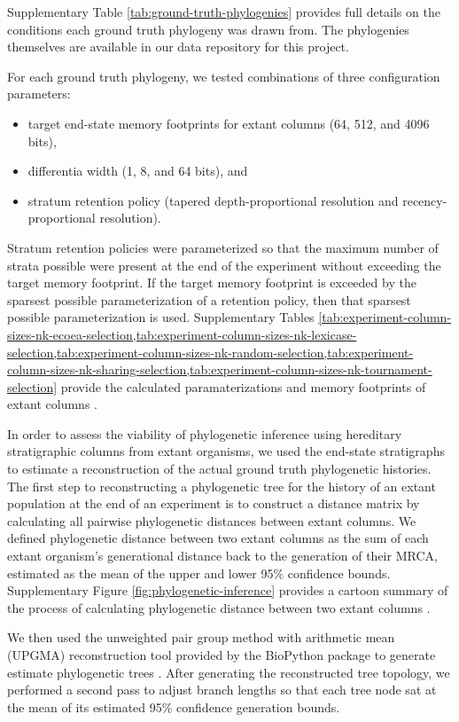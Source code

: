 Supplementary Table \ref{tab:ground-truth-phylogenies} provides full details on the conditions each ground truth phylogeny was drawn from.
The phylogenies themselves are available in our data repository for this project.

For each ground truth phylogeny, we tested combinations of three configuration parameters:
\begin{itemize}
  \item target end-state memory footprints for extant columns (64, 512, and 4096 bits),
  \item differentia width (1, 8, and 64 bits), and
  \item stratum retention policy (tapered depth-proportional resolution and recency-proportional resolution).
\end{itemize}

Stratum retention policies were parameterized so that the maximum number of strata possible were present at the end of the experiment without exceeding the target memory footprint.
If the target memory footprint is exceeded by the sparsest possible parameterization of a retention policy, then that sparsest possible parameterization is used.
Supplementary Tables \cref{tab:experiment-column-sizes-nk-ecoea-selection,tab:experiment-column-sizes-nk-lexicase-selection,tab:experiment-column-sizes-nk-random-selection,tab:experiment-column-sizes-nk-sharing-selection,tab:experiment-column-sizes-nk-tournament-selection} provide the calculated paramaterizations and memory footprints of extant columns \citep{moreno2022hstratconceptsupplement}.

In order to assess the viability of phylogenetic inference using hereditary stratigraphic columns from extant organisms, we used the end-state stratigraphs to estimate a reconstruction of the actual ground truth phylogenetic histories.
The first step to reconstructing a phylogenetic tree for the history of an extant population at the end of an experiment is to construct a distance matrix by calculating all pairwise phylogenetic distances between extant columns.
We defined phylogenetic distance between two extant columns as the sum of each extant organism's generational distance back to the generation of their MRCA, estimated as the mean of the upper and lower 95\% confidence bounds.
Supplementary Figure \ref{fig:phylogenetic-inference} provides a cartoon summary of the process of calculating phylogenetic distance between two extant columns \citep{moreno2022hstratconceptsupplement}.

We then used the unweighted pair group method with arithmetic mean (UPGMA) reconstruction tool provided by the BioPython package to generate estimate phylogenetic trees \citep{cock2009biopython,sokal1958statistical}.
After generating the reconstructed tree topology, we performed a second pass to adjust branch lengths so that each tree node sat at the mean of its estimated 95\% confidence generation bounds.

